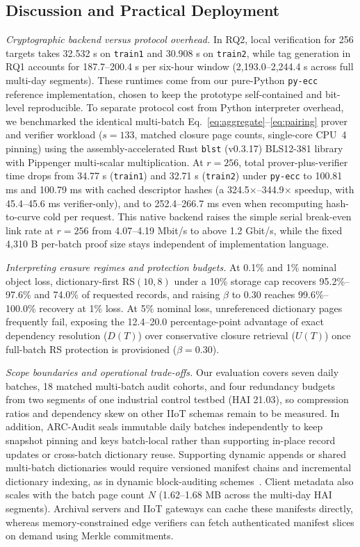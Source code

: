 \documentclass[10pt,journal]{IEEEtran}
\begin{document}
\subsection{Discussion and Practical Deployment}\label{sec:discussion}
\emph{Cryptographic backend versus protocol overhead.}
In RQ2, local verification for 256 targets takes 32.532 s on \texttt{train1} and 30.908 s on \texttt{train2}, while tag generation in RQ1 accounts for 187.7--200.4 s per six-hour window (2,193.0--2,244.4 s across full multi-day segments). These runtimes come from our pure-Python \texttt{py-ecc} reference implementation, chosen to keep the prototype self-contained and bit-level reproducible. To separate protocol cost from Python interpreter overhead, we benchmarked the identical multi-batch Eq.~\eqref{eq:aggregate}--\eqref{eq:pairing} prover and verifier workload ($s=133$, matched closure page counts, single-core CPU~4 pinning) using the assembly-accelerated Rust \texttt{blst} (v0.3.17) BLS12-381 library with Pippenger multi-scalar multiplication. At $r=256$, total prover-plus-verifier time drops from 34.77 s (\texttt{train1}) and 32.71 s (\texttt{train2}) under \texttt{py-ecc} to 100.81 ms and 100.79 ms with cached descriptor hashes (a 324.5$\times$--344.9$\times$ speedup, with 45.4--45.6 ms verifier-only), and to 252.4--266.7 ms even when recomputing hash-to-curve cold per request. This native backend raises the simple serial break-even link rate at $r=256$ from 4.07--4.19 Mbit/s to above 1.2 Gbit/s, while the fixed 4,310 B per-batch proof size stays independent of implementation language.

\emph{Interpreting erasure regimes and protection budgets.}
At 0.1\% and 1\% nominal object loss, dictionary-first RS$(10,8)$ under a 10\% storage cap recovers 95.2\%--97.6\% and 74.0\% of requested records, and raising $\beta$ to 0.30 reaches 99.6\%--100.0\% recovery at 1\% loss. At 5\% nominal loss, unreferenced dictionary pages frequently fail, exposing the 12.4--20.0 percentage-point advantage of exact dependency resolution ($D(T)$) over conservative closure retrieval ($U(T)$) once full-batch RS protection is provisioned ($\beta=0.30$).

\emph{Scope boundaries and operational trade-offs.}
Our evaluation covers seven daily batches, 18 matched multi-batch audit cohorts, and four redundancy budgets from two segments of one industrial control testbed (HAI 21.03), so compression ratios and dependency skew on other IIoT schemas remain to be measured. In addition, ARC-Audit seals immutable daily batches independently to keep snapshot pinning and keys batch-local rather than supporting in-place record updates or cross-batch dictionary reuse. Supporting dynamic appends or shared multi-batch dictionaries would require versioned manifest chains and incremental dictionary indexing, as in dynamic block-auditing schemes~\cite{Pan2026,Xu2026MPA}. Client metadata also scales with the batch page count $N$ (1.62--1.68 MB across the multi-day HAI segments). Archival servers and IIoT gateways can cache these manifests directly, whereas memory-constrained edge verifiers can fetch authenticated manifest slices on demand using Merkle commitments.
\end{document}

